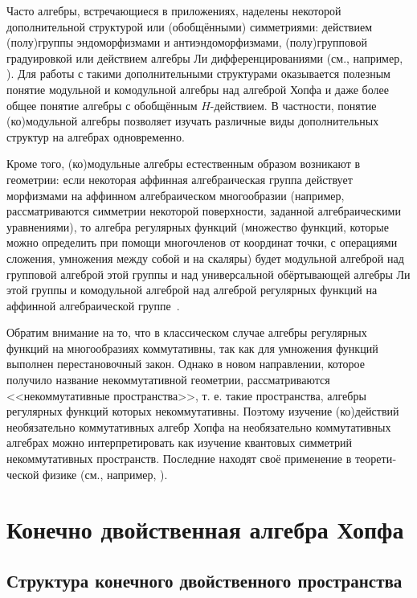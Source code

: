 \documentclass[12pt, reqno, a4paper, oneside, notitlepage]{amsart}
\theoremstyle{mytheoremstyle}
\theoremstyle{myremarkstyle}
\numberwithin{equation}{section}
\begin{document}
Часто алгебры, встречающиеся в приложениях, наделены некоторой дополнительной структурой или (обобщёнными) симметриями: действием (полу)группы эндоморфизмами и антиэндоморфизмами, (полу)групповой градуировкой или действием алгеб­ры Ли дифференцированиями (см., например, \cite{PolyakovBook, HaagBook, KakuBook, MajidBook}). Для работы с такими дополнительными структурами оказывается полезным понятие модульной и комодульной алгебры над алгеброй Хопфа и даже более общее понятие алгебры с обобщённым $H$-действием. В частности, понятие (ко)модульной алгебры позволяет изучать различные виды дополнительных структур на алгебрах одновременно.

Кроме того, (ко)модульные алгебры естественным образом возникают в геометрии: если некоторая аффинная алгебраическая группа действует морфизмами на аффинном алгебраи­ческом многообразии (например, рассматриваются симметрии некоторой поверхности, задан­ной алгебраическими уравнениями), то алгебра регулярных функций (множество функций, которые можно определить при помощи многочленов от координат точки,
с операциями сложения, умножения между собой и на скаляры) будет модульной алгеброй над групповой алгеброй этой группы и над универсальной обёртывающей алгебры Ли этой группы и комодульной алгеброй над алгеброй регулярных функций на аффинной алгебраической группе~\cite{Abe}.

Обратим внимание на то, что в классическом случае алгебры регулярных функций на многообразиях коммутативны, так как для умножения функций выполнен перестановочный закон. Однако в новом направлении, которое получило название некоммутативной геометрии, рассмат­риваются <<некоммутативные пространства>>, т. е. такие пространства, алгебры регулярных функций которых некоммутативны. Поэтому изучение (ко)действий необязательно коммутатив­ных алгебр Хопфа на необязательно коммутативных алгебрах можно интерпретировать как изучение кван­товых симметрий некоммутативных пространств. Последние находят своё применение в теорети­ческой физике (см., например, \cite{ConnesMarcolli, Donatsos}).

\newpage

\section{Конечно двойственная алгебра Хопфа}

\subsection{Структура конечного двойственного пространства}
\end{document}
